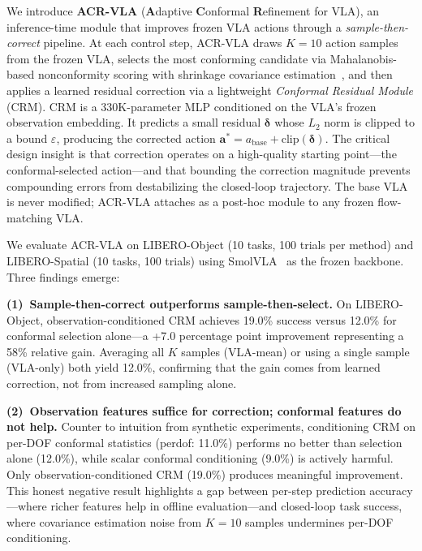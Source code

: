 We introduce \textbf{ACR-VLA} (\textbf{A}daptive \textbf{C}onformal \textbf{R}efinement for VLA), an inference-time module that improves frozen VLA actions through a \emph{sample-then-correct} pipeline.
At each control step, ACR-VLA draws $K{=}10$ action samples from the frozen VLA, selects the most conforming candidate via Mahalanobis-based nonconformity scoring with shrinkage covariance estimation~\cite{ledoit2004well,braun2025cgs}, and then applies a learned residual correction via a lightweight \emph{Conformal Residual Module} (CRM).
CRM is a 330K-parameter MLP conditioned on the VLA's frozen observation embedding.
It predicts a small residual $\boldsymbol{\delta}$ whose $L_2$ norm is clipped to a bound $\varepsilon$, producing the corrected action $\mathbf{a}^* = a_{\mathrm{base}} + \mathrm{clip}(\boldsymbol{\delta})$.
The critical design insight is that correction operates on a high-quality starting point---the conformal-selected action---and that bounding the correction magnitude prevents compounding errors from destabilizing the closed-loop trajectory.
The base VLA is never modified; ACR-VLA attaches as a post-hoc module to any frozen flow-matching VLA.

We evaluate ACR-VLA on LIBERO-Object (10 tasks, 100 trials per method) and LIBERO-Spatial (10 tasks, 100 trials) using SmolVLA~\cite{shukor2025smolvla} as the frozen backbone. Three findings emerge:

\textbf{(1)~Sample-then-correct outperforms sample-then-select.}
On LIBERO-Object, observation-conditioned CRM achieves 19.0\% success versus 12.0\% for conformal selection alone---a +7.0 percentage point improvement representing a 58\% relative gain.
Averaging all $K$ samples (VLA-mean) or using a single sample (VLA-only) both yield 12.0\%, confirming that the gain comes from learned correction, not from increased sampling alone.

\textbf{(2)~Observation features suffice for correction; conformal features do not help.}
Counter to intuition from synthetic experiments, conditioning CRM on per-DOF conformal statistics (perdof: 11.0\%) performs no better than selection alone (12.0\%), while scalar conformal conditioning (9.0\%) is actively harmful.
Only observation-conditioned CRM (19.0\%) produces meaningful improvement.
This honest negative result highlights a gap between per-step prediction accuracy---where richer features help in offline evaluation---and closed-loop task success, where covariance estimation noise from $K{=}10$ samples undermines per-DOF conditioning.

